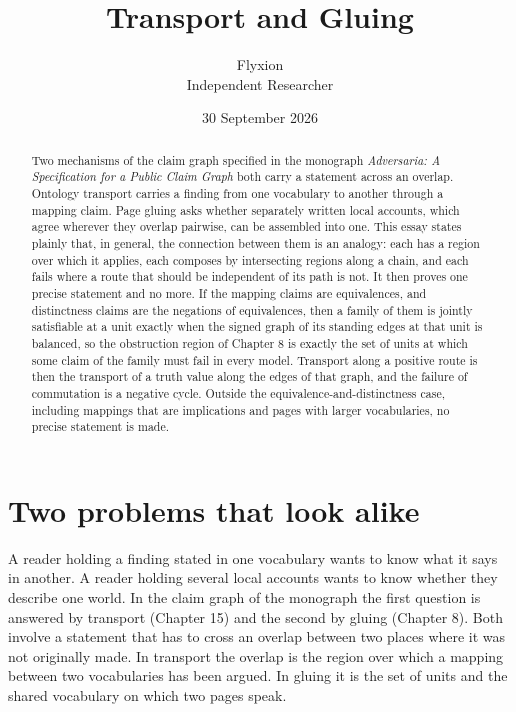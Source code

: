 \documentclass[11pt]{article}
\title{Transport and Gluing}
\author{Flyxion\\\small Independent Researcher}
\date{30 September 2026}
\theoremstyle{plain}
\theoremstyle{definition}
\theoremstyle{remark}
\begin{document}
\maketitle

\begin{abstract}
\noindent
Two mechanisms of the claim graph specified in the monograph \emph{Adversaria: A Specification for a Public Claim Graph} both carry a statement across an overlap. Ontology transport carries a finding from one vocabulary to another through a mapping claim. Page gluing asks whether separately written local accounts, which agree wherever they overlap pairwise, can be assembled into one. This essay states plainly that, in general, the connection between them is an analogy: each has a region over which it applies, each composes by intersecting regions along a chain, and each fails where a route that should be independent of its path is not. It then proves one precise statement and no more. If the mapping claims are equivalences, and distinctness claims are the negations of equivalences, then a family of them is jointly satisfiable at a unit exactly when the signed graph of its standing edges at that unit is balanced, so the obstruction region of Chapter 8 is exactly the set of units at which some claim of the family must fail in every model. Transport along a positive route is then the transport of a truth value along the edges of that graph, and the failure of commutation is a negative cycle. Outside the equivalence-and-distinctness case, including mappings that are implications and pages with larger vocabularies, no precise statement is made.
\end{abstract}

\section{Two problems that look alike}\label{sec:intro}

A reader holding a finding stated in one vocabulary wants to know what it says in another. A reader holding several local accounts wants to know whether they describe one world. In the claim graph of the monograph the first question is answered by transport (Chapter 15) and the second by gluing (Chapter 8). Both involve a statement that has to cross an overlap between two places where it was not originally made. In transport the overlap is the region over which a mapping between two vocabularies has been argued. In gluing it is the set of units and the shared vocabulary on which two pages speak.
\end{document}
